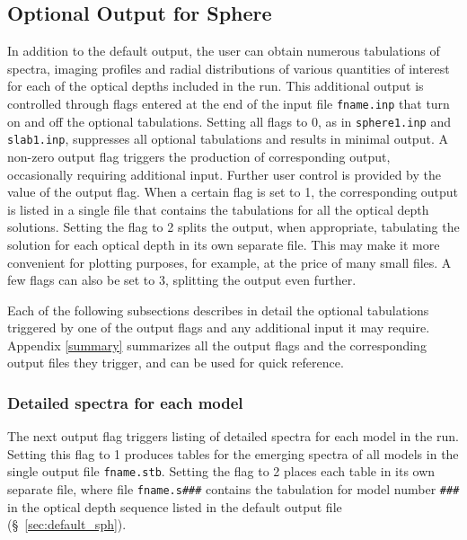 \documentclass[11pt]{article}
\begin{document}
\subsection{Optional Output for Sphere}
\label{sec:optional_sph}

In addition to the default output, the user can obtain numerous
tabulations of spectra, imaging profiles and radial distributions of
various quantities of interest for each of the optical depths included
in the run. This additional output is controlled through flags entered
at the end of the input file {\tt fname.inp} that turn on and off the
optional tabulations.  Setting all flags to 0, as in {\tt sphere1.inp}
and {\tt slab1.inp}, suppresses all optional tabulations and results
in minimal output. A non-zero output flag triggers the production of
corresponding output, occasionally requiring additional input.
Further user control is provided by the value of the output flag. When
a certain flag is set to 1, the corresponding output is listed in a
single file that contains the tabulations for all the optical depth
solutions. Setting the flag to 2 splits the output, when appropriate,
tabulating the solution for each optical depth in its own separate
file. This may make it more convenient for plotting purposes, for
example, at the price of many small files.  A few flags can also be
set to 3, splitting the output even further.

Each of the following subsections describes in detail the optional
tabulations triggered by one of the output flags and any additional
input it may require.  Appendix \ref{summary} summarizes all the
output flags and the corresponding output files they trigger, and can
be used for quick reference.


\subsubsection {Detailed spectra for each model}
\label{sec:detail_sph}

The next output flag triggers listing of detailed spectra for each model in
the run.  Setting this flag to 1 produces tables for the emerging spectra of
all models in the single output file {\tt fname.stb}.  Setting the flag to 2
places each table in its own separate file, where file {\tt fname.s\#\#\#}
contains the tabulation for model number {\tt \#\#\#} in the optical depth
sequence listed in the default output file (\S~\ref{sec:default_sph}).
\end{document}
